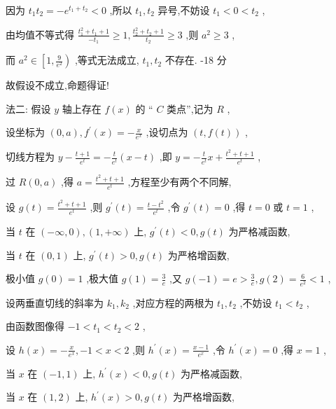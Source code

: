 \documentclass[10pt]{article}
\begin{document}
因为 \({t}_{1}{t}_{2} =  - {e}^{{t}_{1} + {t}_{2}} < 0\) ,所以 \({t}_{1},{t}_{2}\) 异号,不妨设 \({t}_{1} < 0 < {t}_{2}\) ,

由均值不等式得 \(\frac{{t}_{1}^{2} + {t}_{1} + 1}{-{t}_{1}} \geq  1,\frac{{t}_{2}^{2} + {t}_{2} + 1}{{t}_{2}} \geq  3\) ,则 \({a}^{2} \geq  3\) ,

而 \({a}^{2} \in  \left\lbrack  {1,\frac{9}{{e}^{2}}}\right)\) ,等式无法成立, \({t}_{1},{t}_{2}\) 不存在. -18 分

故假设不成立,命题得证!

法二: 假设 \(y\) 轴上存在 \(f\left( x\right)\) 的 “ \(C\) 类点”,记为 \(R\) ,

设坐标为 \(\left( {0,a}\right) ,{f}^{\prime }\left( x\right)  =  - \frac{x}{{e}^{x}}\) ,设切点为 \(\left( {t,f\left( t\right) }\right)\) ,

切线方程为 \(y - \frac{t + 1}{{e}^{t}} =  - \frac{t}{{e}^{t}}\left( {x - t}\right)\) ,即 \(y =  - \frac{t}{{e}^{t}}x + \frac{{t}^{2} + t + 1}{{e}^{t}}\) ,

过 \(R\left( {0,a}\right)\) ,得 \(a = \frac{{t}^{2} + t + 1}{{e}^{t}}\) ,方程至少有两个不同解,

设 \(g\left( t\right)  = \frac{{t}^{2} + t + 1}{{e}^{t}}\) ,则 \({g}^{\prime }\left( t\right)  = \frac{t - {t}^{2}}{{e}^{t}}\) ,令 \({g}^{\prime }\left( t\right)  = 0\) ,得 \(t = 0\) 或 \(t = 1\) ,

当 \(t\) 在 \(\left( {-\infty ,0}\right) ,\left( {1, + \infty }\right)\) 上, \({g}^{\prime }\left( t\right)  < 0,g\left( t\right)\) 为严格减函数,

当 \(t\) 在 \(\left( {0,1}\right)\) 上, \({g}^{\prime }\left( t\right)  > 0,g\left( t\right)\) 为严格增函数,

极小值 \(g\left( 0\right)  = 1\) ,极大值 \(g\left( 1\right)  = \frac{3}{e}\) ,又 \(g\left( {-1}\right)  = e > \frac{3}{e},g\left( 2\right)  = \frac{6}{{e}^{2}} < 1\) ,

设两垂直切线的斜率为 \({k}_{1},{k}_{2}\) ,对应方程的两根为 \({t}_{1},{t}_{2}\) ,不妨设 \({t}_{1} < {t}_{2}\) ,

由函数图像得 \(- 1 < {t}_{1} < {t}_{2} < 2\) ,

设 \(h\left( x\right)  =  - \frac{x}{{e}^{x}}, - 1 < x < 2\) ,则 \({h}^{\prime }\left( x\right)  = \frac{x - 1}{{e}^{x}}\) ,令 \({h}^{\prime }\left( x\right)  = 0\) ,得 \(x = 1\) ,

当 \(x\) 在 \(\left( {-1,1}\right)\) 上, \({h}^{\prime }\left( x\right)  < 0,g\left( t\right)\) 为严格减函数,

当 \(x\) 在 \(\left( {1,2}\right)\) 上, \({h}^{\prime }\left( x\right)  > 0,g\left( t\right)\) 为严格增函数,
\end{document}
